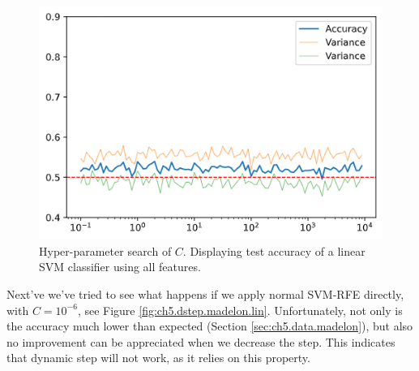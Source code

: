 \begin{figure}[h]
    \centering
    \includegraphics[width=0.4\linewidth]{img/ch5/madelon-cv-c}
    \caption{Hyper-parameter search of $C$. Displaying test accuracy of a linear SVM classifier using all features.}
    \label{fig:ch5.dstep.madelon.reg}
\end{figure}

Next've we've tried to see what happens if we apply normal SVM-RFE directly, with $C=10^{-6}$, see Figure \ref{fig:ch5.dstep.madelon.lin}. Unfortunately, not only is the accuracy much lower than expected (Section \ref{sec:ch5.data.madelon}), but also no improvement can be appreciated when we decrease the step. This indicates that dynamic step will not work, as it relies on this property.

